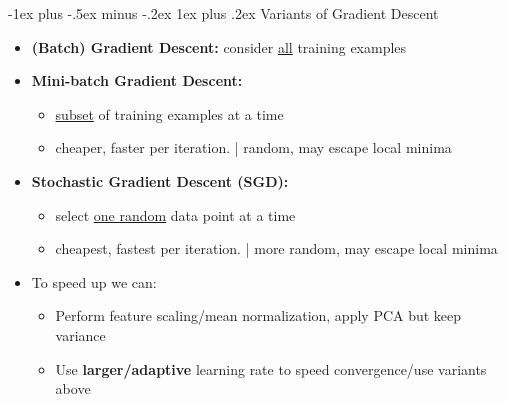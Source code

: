 \documentclass[10pt,landscape]{article}
\makeatletter
\newcommand{\subsubsubsection}{\@startsection{subsubsection}{3}{0mm}%
                                {-1ex plus -.5ex minus -.2ex}%
                                {1ex plus .2ex}%
                                {\normalfont\scriptsize\bfseries}}
\makeatother
\begin{document}
\begin{multicols*}{3}
\subsubsubsection{Variants of Gradient Descent}
\begin{itemize}[topsep=0pt,noitemsep,wide=0pt, leftmargin=\dimexpr{} + 2\relax]
  \item \textbf{(Batch) Gradient Descent:} consider \underline{all} training examples
  \item \textbf{Mini-batch Gradient Descent:}
  \begin{itemize}[topsep=0pt,noitemsep,wide=0pt, leftmargin=\dimexpr{} + 2\relax]
    \item \underline{subset} of training examples at a time
    \item cheaper, faster per iteration. | random, may escape local minima
  \end{itemize}
  \item \textbf{Stochastic Gradient Descent (SGD):}
  \begin{itemize}[topsep=0pt,noitemsep,wide=0pt, leftmargin=\dimexpr{} + 2\relax]
    \item select \underline{one random} data point at a time
    \item cheapest, fastest per iteration. | more random, may escape local minima
  \end{itemize}
  \item To speed up we can:
  \begin{itemize}[topsep=0pt,noitemsep,wide=0pt, leftmargin=\dimexpr{} + 2\relax]
    \item Perform feature scaling/mean normalization, apply PCA but keep variance
    \item Use \textbf{larger/adaptive} learning rate to speed convergence/use variants above
  \end{itemize}
\end{itemize}


\end{multicols*}
\end{document}

